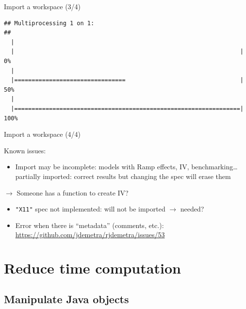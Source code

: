 \documentclass[10pt,xcolor=table,color={dvipsnames,usenames},ignorenonframetext,usepdftitle=false,french]{beamer}
\providecommand{\tightlist}{%
  \setlength{\parskip}{0pt}
  }
\begin{document}
\begin{frame}[fragile]{Import a workspace (3/4)}
\begin{verbatim}
## Multiprocessing 1 on 1:
## 
  |                                                                       
  |                                                                 |   0%
  |                                                                       
  |================================                                 |  50%
  |                                                                       
  |=================================================================| 100%
\end{verbatim}

\end{frame}

\begin{frame}[fragile]{Import a workspace (4/4)}
\protect\hypertarget{import-a-workspace-44}{}

Known issues:

\begin{itemize}
\tightlist
\item
  Import may be incomplete: models with Ramp effects, IV,
  benchmarking\ldots{} partially imported: \bcsmbh correct results but
  \bcsmmh changing the spec will erase them
\end{itemize}

\(\rightarrow\) \bcquestion Someone has a \faRProject{} function to
create IV?

\begin{itemize}
\item
  \texttt{"X11"} spec not implemented: will not be imported
  \(\rightarrow\) needed?
\item
  Error when there is ``metadata'' (comments, etc.):
  \url{https://github.com/jdemetra/rjdemetra/issues/53}
\end{itemize}

\end{frame}

\hypertarget{reduce-time-computation}{%
\section{Reduce time computation}\label{reduce-time-computation}}

\hypertarget{manipulate-java-objects}{%
\subsection{Manipulate Java objects}\label{manipulate-java-objects}}
\end{document}
